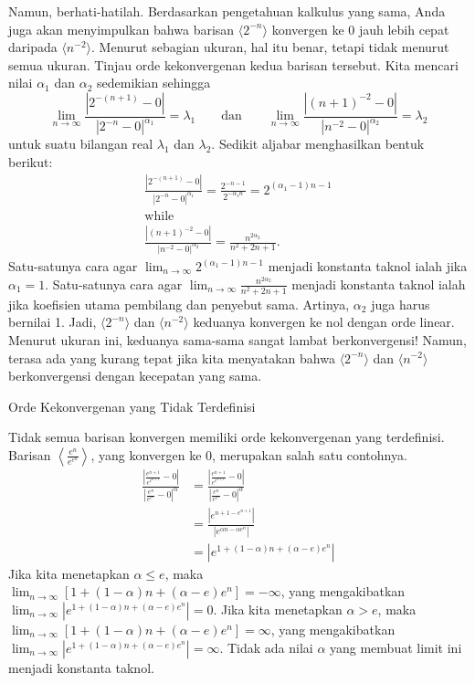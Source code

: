 Namun, berhati-hatilah. Berdasarkan pengetahuan kalkulus yang sama,
Anda juga akan menyimpulkan bahwa barisan $\langle2^{-n}\rangle$
konvergen ke 0 jauh lebih cepat daripada $\langle n^{-2}\rangle$.
Menurut sebagian ukuran, hal itu benar, tetapi tidak menurut semua
ukuran. Tinjau orde kekonvergenan kedua barisan tersebut. Kita mencari
nilai $\alpha_{1}$ dan $\alpha_{2}$ sedemikian sehingga
\[
\lim_{n\to\infty}\frac{|2^{-(n+1)}-0|}{|2^{-n}-0|^{\alpha_{1}}}=\lambda_{1}\qquad\mbox{dan}\qquad\lim_{n\to\infty}\frac{|(n+1)^{-2}-0|}{|n^{-2}-0|^{\alpha_{2}}}=\lambda_{2}
\]
untuk suatu bilangan real $\lambda_{1}$ dan $\lambda_{2}$. Sedikit
aljabar menghasilkan bentuk berikut:
\[
\begin{gathered}\frac{|2^{-(n+1)}-0|}{|2^{-n}-0|^{\alpha_{1}}}=\frac{2^{-n-1}}{2^{-\alpha_{1}n}}=2^{(\alpha_{1}-1)n-1}\\
\mbox{while}\\
\frac{|(n+1)^{-2}-0|}{|n^{-2}-0|^{\alpha_{2}}}=\frac{n^{2\alpha_{2}}}{n^{2}+2n+1}.
\end{gathered}
\]
Satu-satunya cara agar $\lim_{n\to\infty}2^{(\alpha_{1}-1)n-1}$ menjadi
konstanta taknol ialah jika $\alpha_{1}=1$. Satu-satunya cara agar
$\lim_{n\to\infty}\frac{n^{2\alpha_{2}}}{n^{2}+2n+1}$ menjadi konstanta
taknol ialah jika koefisien utama pembilang dan penyebut sama. Artinya,
$\alpha_{2}$ juga harus bernilai 1. Jadi, $\langle2^{-n}\rangle$
dan $\langle n^{-2}\rangle$ keduanya konvergen ke nol dengan orde
linear. Menurut ukuran ini, keduanya sama-sama sangat lambat berkonvergensi!
Namun, terasa ada yang kurang tepat jika kita menyatakan bahwa $\langle2^{-n}\rangle$
dan $\langle n^{-2}\rangle$ berkonvergensi dengan kecepatan yang
sama. 

\begin{digression}{Orde Kekonvergenan yang Tidak Terdefinisi}

Tidak semua barisan konvergen memiliki orde kekonvergenan yang terdefinisi.
Barisan ${\displaystyle \left\langle \frac{e^{n}}{e^{e^{n}}}\right\rangle }$,
yang konvergen ke 0, merupakan salah satu contohnya.
\begin{align*}
\frac{\left|\frac{e^{n+1}}{e^{e^{n+1}}}-0\right|}{\left|\frac{e^{n}}{e^{e^{n}}}-0\right|^{\alpha}} & =\frac{\left|\frac{e^{n+1}}{e^{e^{n+1}}}-0\right|}{\left|\frac{e^{n}}{e^{e^{n}}}-0\right|^{\alpha}}\\
 & =\frac{\left|e^{n+1-e^{n+1}}\right|}{\left|e^{\alpha n-\alpha e^{n}}\right|}\\
 & =\left|e^{1+(1-\alpha)n+(\alpha-e)e^{n}}\right|
\end{align*}
Jika kita menetapkan $\alpha\leq e$, maka ${\displaystyle \lim_{n\to\infty}[1+(1-\alpha)n+(\alpha-e)e^{n}]=-\infty}$,
yang mengakibatkan ${\displaystyle \lim_{n\to\infty}\left|e^{1+(1-\alpha)n+(\alpha-e)e^{n}}\right|=0}$.
Jika kita menetapkan $\alpha>e$, maka ${\displaystyle \lim_{n\to\infty}[1+(1-\alpha)n+(\alpha-e)e^{n}]=\infty}$,
yang mengakibatkan ${\displaystyle \lim_{n\to\infty}\left|e^{1+(1-\alpha)n+(\alpha-e)e^{n}}\right|=\infty}$.
Tidak ada nilai $\alpha$ yang membuat limit ini menjadi konstanta
taknol.

\end{digression}

